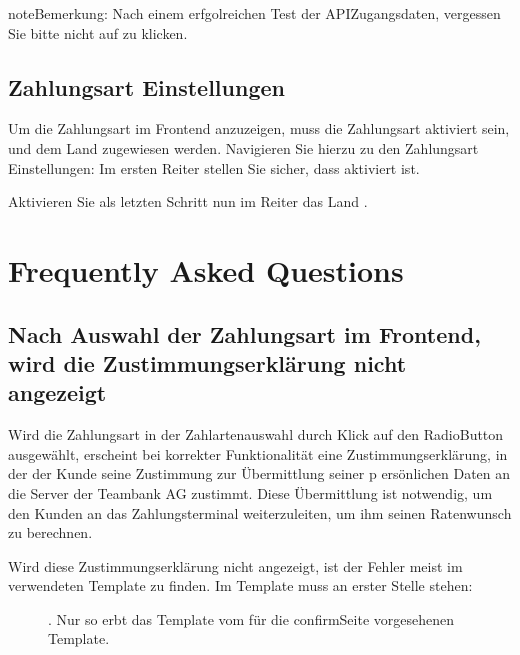 \documentclass[a4paper,10pt,openany,oneside,ngerman]{sphinxmanual}
\begin{document}
\begin{sphinxadmonition}{note}{Bemerkung:}
Nach einem erfgolreichen Test der API\sphinxhyphen{}Zugangsdaten, vergessen Sie bitte nicht auf  zu klicken.
\end{sphinxadmonition}


\section{Zahlungsart Einstellungen}
\label{\detokenize{configuration:zahlungsart-einstellungen}}
Um die Zahlungsart  im Frontend anzuzeigen, muss die Zahlungsart aktiviert sein, und dem Land  zugewiesen werden. Navigieren Sie hierzu zu den Zahlungsart Einstellungen: 
Im ersten Reiter  stellen Sie sicher, dass  aktiviert ist.

\noindent{}

\clearpage

Aktivieren Sie als letzten Schritt nun im Reiter  das Land .

\noindent{}


\chapter{Frequently Asked Questions}
\label{\detokenize{faq:frequently-asked-questions}}\label{\detokenize{faq::doc}}

\section{Nach Auswahl der Zahlungsart im Frontend, wird die Zustimmungserklärung nicht angezeigt}
\label{\detokenize{faq:nach-auswahl-der-zahlungsart-im-frontend-wird-die-zustimmungserklarung-nicht-angezeigt}}
Wird die Zahlungsart in der Zahlartenauswahl durch Klick auf den Radio\sphinxhyphen{}Button ausgewählt, erscheint bei korrekter Funktionalität eine Zustimmungserklärung, in der der Kunde seine Zustimmung zur Übermittlung seiner p
ersönlichen Daten an die Server der Teambank AG zustimmt. Diese Übermittlung ist notwendig, um den Kunden an das Zahlungsterminal weiterzuleiten, um ihm seinen Ratenwunsch zu berechnen.
\begin{description}
\item[{Wird diese Zustimmungserklärung nicht angezeigt, ist der Fehler meist im verwendeten Template zu finden. Im Template  muss an erster Stelle stehen:}] \leavevmode
{}. Nur so erbt das Template vom für die confirm\sphinxhyphen{}Seite vorgesehenen Template.

\end{description}
\end{document}
